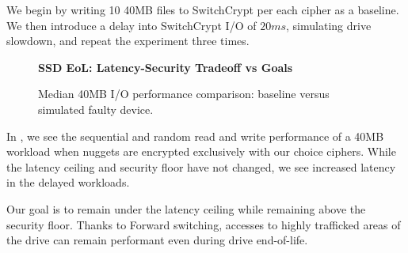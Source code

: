 We begin by writing 10 40MB files to SwitchCrypt per each cipher as a baseline.
We then introduce a delay into SwitchCrypt I/O of $20ms$, simulating drive
slowdown, and repeat the experiment three times.

\begin{figure}[ht] \textbf{SSD EoL: Latency-Security Tradeoff vs
   Goals}\par\medskip {} \caption{Median
   40MB I/O performance comparison: baseline versus simulated faulty device.}
  \label{fig:usecase-eol-tradeoff}
\end{figure}

In , we see the sequential and random read and
write performance of a 40MB workload when nuggets are encrypted exclusively with
our choice ciphers. While the latency ceiling and security floor have not
changed, we see increased latency in the delayed workloads.

Our goal is to remain under the latency ceiling while remaining above the
security floor. Thanks to Forward switching, accesses to highly trafficked areas
of the drive can remain performant even during drive end-of-life.
